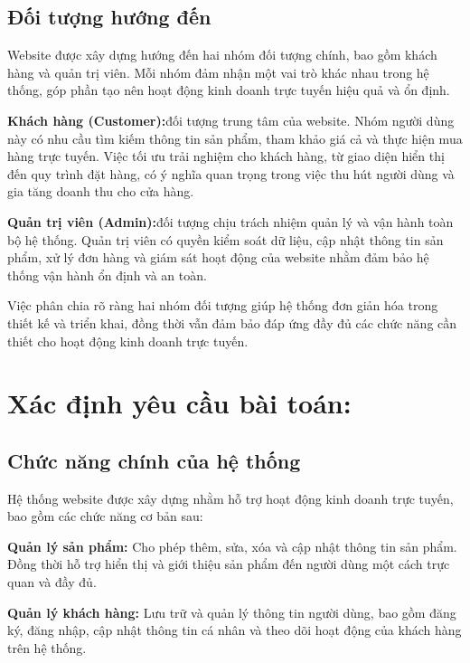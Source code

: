 \documentclass[pt = 12,a4paper]{article}
\begin{document}
\subsection{Đối tượng hướng đến }

\hspace{0.4cm} Website được xây dựng hướng đến hai nhóm đối tượng chính, bao gồm khách hàng và quản trị viên. Mỗi nhóm đảm nhận một vai trò khác nhau trong hệ thống, góp phần tạo nên hoạt động kinh doanh trực tuyến hiệu quả và ổn định.

\hspace{0.4cm}\textbf{Khách hàng (Customer):}đối tượng trung tâm của website. Nhóm người dùng này có nhu cầu tìm kiếm thông tin sản phẩm, tham khảo giá cả và thực hiện mua hàng trực tuyến. Việc tối ưu trải nghiệm cho khách hàng, từ giao diện hiển thị đến quy trình đặt hàng, có ý nghĩa quan trọng trong việc thu hút người dùng và gia tăng doanh thu cho cửa hàng.


\hspace{0.4cm} \textbf{Quản trị viên (Admin):}đối tượng chịu trách nhiệm quản lý và vận hành toàn bộ hệ thống. Quản trị viên có quyền kiểm soát dữ liệu, cập nhật thông tin sản phẩm, xử lý đơn hàng và giám sát hoạt động của website nhằm đảm bảo hệ thống vận hành ổn định và an toàn.

\hspace{0.4cm} Việc phân chia rõ ràng hai nhóm đối tượng giúp hệ thống đơn giản hóa trong thiết kế và triển khai, đồng thời vẫn đảm bảo đáp ứng đầy đủ các chức năng cần thiết cho hoạt động kinh doanh trực tuyến.

\section{Xác định yêu cầu bài toán:}
\subsection{Chức năng chính của hệ thống}

\hspace{0.4cm} Hệ thống website được xây dựng nhằm hỗ trợ hoạt động kinh doanh trực tuyến, bao gồm các chức năng cơ bản sau:

\hspace{0.4cm} \textbf{Quản lý sản phẩm:} Cho phép thêm, sửa, xóa và cập nhật thông tin sản phẩm. Đồng thời hỗ trợ hiển thị và giới thiệu sản phẩm đến người dùng một cách trực quan và đầy đủ.

\hspace{0.4cm} \textbf{Quản lý khách hàng:} Lưu trữ và quản lý thông tin người dùng, bao gồm đăng ký, đăng nhập, cập nhật thông tin cá nhân và theo dõi hoạt động của khách hàng trên hệ thống.
\end{document}
